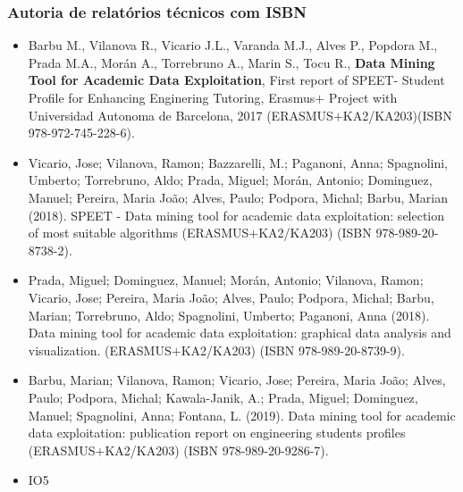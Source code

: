 \documentclass[11pt]{article}
\begin{document}
\subsubsection{Autoria de relatórios técnicos com ISBN}
\begin{itemize}
\item{ Barbu M., Vilanova R., Vicario J.L., Varanda M.J., Alves P., Popdora M., Prada M.A., Morán A., Torrebruno A., Marin S., Tocu R., {
\bf{{Data Mining Tool for Academic Data Exploitation}}}, First report of SPEET- Student Profile for Enhancing Enginering Tutoring, Erasmus$+$ Project with Universidad Autonoma de Barcelona, 2017 (ERASMUS$+$KA2/KA203)(ISBN 978-972-745-228-6).}
\item{ Vicario, Jose; Vilanova, Ramon; Bazzarelli, M.; Paganoni, Anna; Spagnolini, Umberto; Torrebruno, Aldo; Prada, Miguel; Morán, Antonio; Dominguez, Manuel; Pereira, Maria João; Alves, Paulo; Podpora, Michal; Barbu, Marian (2018). SPEET - Data mining tool for academic data exploitation: selection of most suitable algorithms (ERASMUS$+$KA2/KA203) (ISBN 978-989-20-8738-2).}
\item{ Prada, Miguel; Dominguez, Manuel; Morán, Antonio; Vilanova, Ramon; Vicario, Jose; Pereira, Maria João; Alves, Paulo; Podpora, Michal; Barbu, Marian; Torrebruno, Aldo; Spagnolini, Umberto; Paganoni, Anna (2018). Data mining tool for academic data exploitation: graphical data analysis and visualization. (ERASMUS$+$KA2/KA203) (ISBN 978-989-20-8739-9).}
\item{ Barbu, Marian; Vilanova, Ramon; Vicario, Jose; Pereira, Maria João; Alves, Paulo; Podpora, Michal; Kawala-Janik, A.; Prada, Miguel; Dominguez, Manuel; Spagnolini, Anna; Fontana, L. (2019). Data mining tool for academic data exploitation: publication report on engineering students profiles (ERASMUS$+$KA2/KA203) (ISBN 978-989-20-9286-7).}
\item{ IO5 }
\end{itemize}
\end{document}
